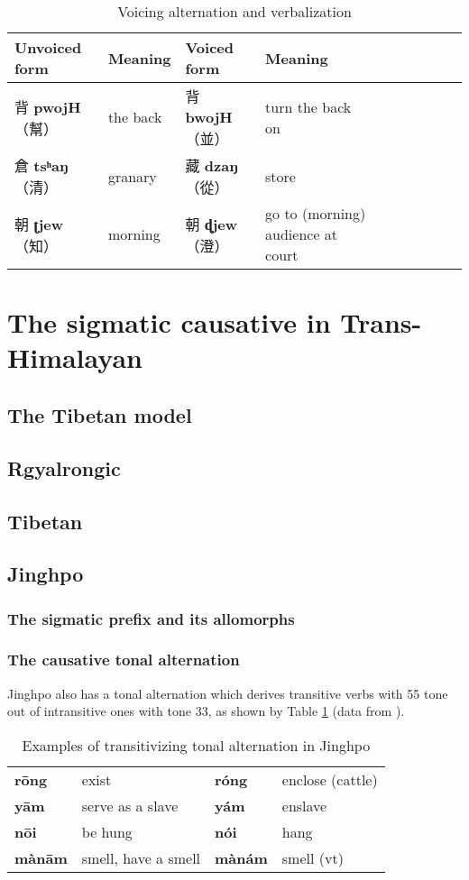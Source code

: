 \documentclass[oneside,a4paper,11pt]{article}
\newcommand{\ipa}[1]{\textbf{{\phon\mbox{#1}}}} %
\newcommand{\zh}[1]{{\cn #1}}
\newcommand{\zhc}[2]{\zh{#1} \ipa{#2}}
\newcommand{\mc}[1]{\zh{（#1）}}
\begin{document}
\begin{table}[H]
\caption{Voicing alternation and verbalization}
\begin{tabular}{llllllllll}
\toprule
Unvoiced form &Meaning & Voiced form & Meaning\\
\midrule
\zhc{背}{pwojH} \mc{幫}	&the back& \zhc{背}{bwojH} \mc{並} & turn the back on \\
\zhc{倉}{tsʰaŋ} \mc{清}	&granary & \zhc{藏}{dzaŋ} \mc{從} & store \\
\zhc{朝}{ʈjew} \mc{知}	&morning  & \zhc{朝}{ɖjew} \mc{澄} & go to (morning) audience at court \\
\bottomrule
\end{tabular}
\end{table}


\section{The sigmatic causative in Trans-Himalayan}

\subsection{The Tibetan model}

\subsection{Rgyalrongic}
\subsection{Tibetan}
\subsection{Jinghpo}

\subsubsection{The sigmatic prefix and its allomorphs}
\subsubsection{The causative tonal alternation}
Jinghpo also has a tonal alternation which derives transitive verbs with 55 tone out of intransitive ones with tone 33, as shown by Table \ref{tab:jinghpo.tone} (data from  \citet[78]{dai92yufa}).

\begin{table}
\caption{Examples of transitivizing tonal alternation in Jinghpo} \label{tab:jinghpo.tone} \centering
\begin{tabular}{llll}
\toprule
\ipa{rōng} &exist &\ipa{róng} &enclose (cattle) \\
\ipa{yām} &serve as a slave &\ipa{yám} &enslave \\
\ipa{nōi} &be hung &\ipa{nói} &hang \\
\ipa{mànām} &smell, have a smell &\ipa{mànám} &smell (vt) \\
\bottomrule
\end{tabular}
\end{table}
 
\end{document}
